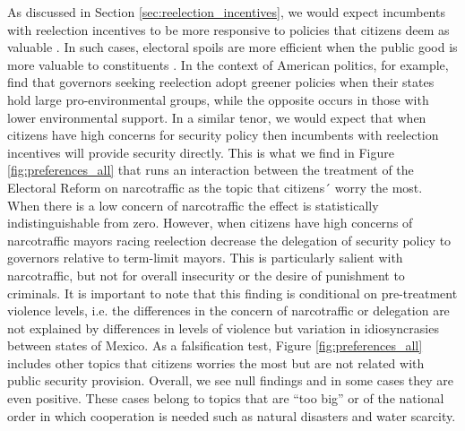 \documentclass[12pt]{amsart}
\numberwithin{equation}{section}
\theoremstyle{definition}
\theoremstyle{definition}
\theoremstyle{definition}
\begin{document}
As discussed in Section \ref{sec:reelection_incentives}, we would expect incumbents with reelection incentives to be more responsive to policies that citizens deem as valuable \citep{milner_2004}. In such cases, electoral spoils are more efficient when the public good is more valuable to constituents \citep{lizzeri_2001}. In the context of American politics, for example, \citet{list_sturm_2006} find that governors seeking reelection adopt greener policies when their states hold large pro-environmental groups, while the opposite occurs in those with lower environmental support. In a similar tenor, we would expect that when citizens have high concerns for security policy then incumbents with reelection incentives will provide security directly. This is what we find in Figure \ref{fig:preferences_all} that runs an interaction between the treatment of the Electoral Reform on narcotraffic as the topic that citizens´ worry the most. When there is a low concern of narcotraffic the effect is statistically indistinguishable from zero. However, when citizens have high concerns of narcotraffic mayors racing reelection decrease the delegation of security policy to governors relative to term-limit mayors. This is particularly salient with narcotraffic, but not for overall insecurity or the desire of punishment to criminals. It is important to note that this finding is conditional on    pre-treatment violence levels, i.e. the differences in the concern of narcotraffic or delegation are not explained by differences in levels of violence but variation in idiosyncrasies between states of Mexico. As a  falsification test,  Figure \ref{fig:preferences_all} includes other topics that citizens worries the most but are not related with public security provision. Overall, we see null findings and in some cases they are even positive. These cases belong to topics that are ``too big'' or of the national order in which cooperation is needed such as natural disasters and water scarcity. 
 
\end{document}
